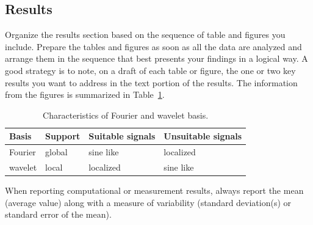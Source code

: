 \subsection{Results}

Organize the results section based on the sequence of table and
figures you include. Prepare the tables and figures as soon as all
the data are analyzed and arrange them in the sequence that best
presents your findings in a logical way. A good strategy is to note,
on a draft of each table or figure, the one or two key results you
want to address in the text portion of the results.
The information from the figures is
summarized in Table~\ref{tab:fourier-wavelet}.

\begin{table}[htbp]
  \centering
  \begin{tabular}[c]{|l||l|l|l|}
    \hline
    Basis&Support&Suitable signals&Unsuitable signals\\
    \hline
    Fourier&global&sine like&localized\\
    wavelet&local&localized&sine like\\
    \hline
  \end{tabular}
  \caption{Characteristics of Fourier and wavelet basis.}
  \label{tab:fourier-wavelet}
\end{table}

When reporting computational or measurement results, always
report the mean (average value) along with a measure of variability
(standard deviation(s) or standard error of the mean).
